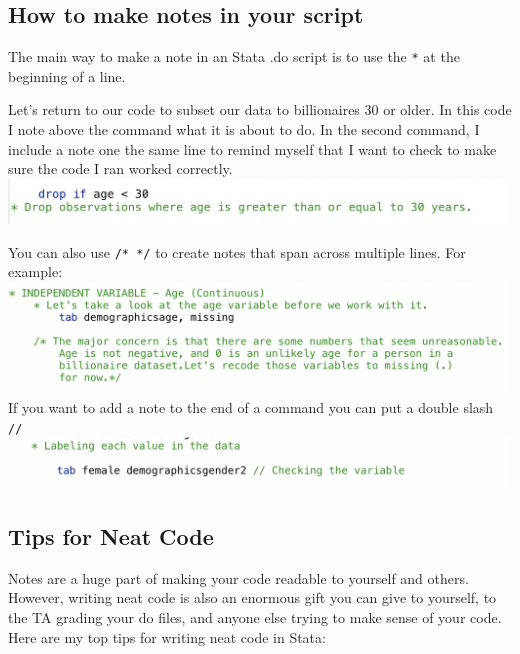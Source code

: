 \documentclass[
]{book}
\begin{document}
\hypertarget{how-to-make-notes-in-your-script}{%
\subsection*{How to make notes in your script}\label{how-to-make-notes-in-your-script}}

The main way to make a note in an Stata .do script is to use the \texttt{*} at the beginning of a line.

Let's return to our code to subset our data to billionaires 30 or older. In this code I note above the command what it is about to do. In the second command, I include a note one the same line to remind myself that I want to check to make sure the code I ran worked correctly.
\includegraphics[width=5.20833in,height=\textheight]{images/notes1.png}

You can also use \texttt{/*\ */} to create notes that span across multiple lines. For example:
\includegraphics[width=5.20833in,height=\textheight]{images/notes2.png}
If you want to add a note to the end of a command you can put a double slash \texttt{//}
\includegraphics[width=5.20833in,height=\textheight]{images/notes3.png}

\hypertarget{tips-for-neat-code}{%
\subsection*{Tips for Neat Code}\label{tips-for-neat-code}}

Notes are a huge part of making your code readable to yourself and others. However, writing neat code is also an enormous gift you can give to yourself, to the TA grading your do files, and anyone else trying to make sense of your code. Here are my top tips for writing neat code in Stata:
\end{document}
